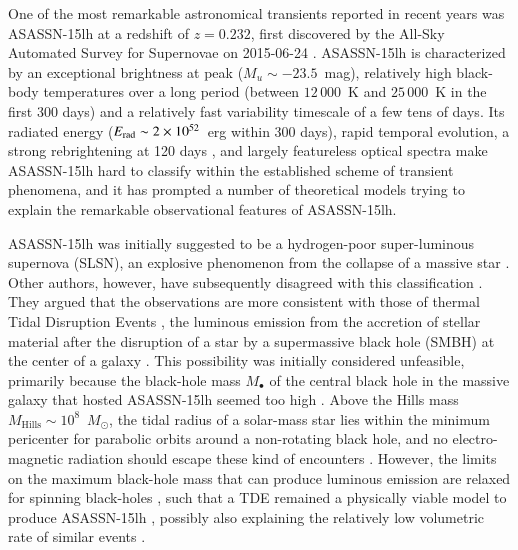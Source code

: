 \documentclass[traditabstract]{aa}
\newcommand{\Msun}{$M_\odot$}
\begin{document}
One of the most remarkable astronomical transients reported in recent years was ASASSN-15lh at a redshift of $z=0.232$, first discovered by the All-Sky Automated Survey for Supernovae \citep[ASAS-SN;][]{2014ApJ...788...48S} on 2015-06-24 \citep{2015ATel.7642....1N}. ASASSN-15lh is characterized by an exceptional brightness at peak ($M_u\sim-23.5$~mag), relatively high black-body temperatures over a long period (between $12\,000$~K and $25\,000$~K in the first 300 days) and a relatively fast variability timescale of a few tens of days. Its radiated energy ($E_{\rm rad}\sim2\times10^{52}$~erg within 300 days), rapid temporal evolution, a strong rebrightening at 120 days \citep{2016ApJ...828....3B}, and largely featureless optical spectra \citep{2016Sci...351..257D, 2016NatAs...1E...2L} make ASASSN-15lh hard to classify within the established scheme of transient phenomena, and it has prompted a number of theoretical models \citep[e.g.,][]{2015MNRAS.454.3311M, 2016ApJ...817L...8B,2016MNRAS.459L..21K,2017arXiv170504689C,2016ApJ...820L..38S} trying to explain the remarkable observational features of ASASSN-15lh.

ASASSN-15lh was initially suggested \citep[][]{2016Sci...351..257D, 2017MNRAS.466.1428G} to be a hydrogen-poor super-luminous supernova (SLSN), an explosive phenomenon from the collapse of a massive star \citep{2011Natur.474..487Q}. Other authors, however, have subsequently disagreed with this classification \citep{2016NatAs...1E...2L,  2017ApJ...836...25M}. They argued that the observations are more consistent with those of thermal Tidal Disruption Events \citep[TDEs, e.g.,][]{1999A&A...349L..45K, 1999A&A...343..775K, 2008ApJ...676..944G, 2011ApJ...741...73V, 2012Natur.485..217G, 2014ApJ...793...38A}, the luminous emission from the accretion of stellar material after the disruption of a star by a supermassive black hole (SMBH) at the center of a galaxy \citep[e.g.,][]{1988Natur.333..523R, 1989ApJ...346L..13E}. This possibility was initially considered unfeasible, primarily because the black-hole mass $M_\bullet$ of the central black hole in the massive galaxy that hosted ASASSN-15lh seemed too high \citep{2015ATel.7776....1P}. Above the Hills mass $M_{\mathrm{Hills}}\sim10^{8}$~\Msun, the tidal radius of a solar-mass star lies within the minimum pericenter for parabolic orbits around a non-rotating black hole, and no electro-magnetic radiation should escape these kind of encounters \citep{1975Natur.254..295H}. However, the limits on the maximum black-hole mass that can produce luminous emission are relaxed for spinning black-holes \citep{2012PhRvD..85b4037K}, such that a TDE remained a physically viable model to produce ASASSN-15lh \citep{2016NatAs...1E...2L}, possibly also explaining the relatively low volumetric rate of similar events \citep{2017arXiv170703458V}. 
\end{document}
